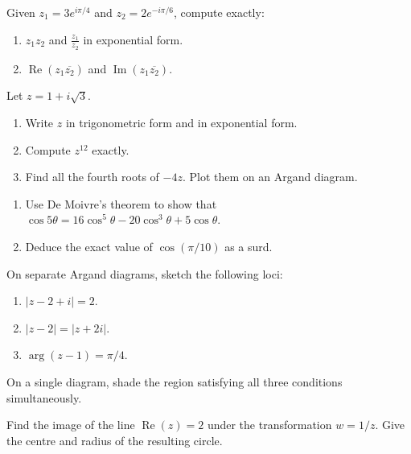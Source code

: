 \documentclass[11pt]{article}
\newcounter{popsec}
\newcounter{popsub}
\newcommand{\courssub}[1]{%
  \stepcounter{popsub}%
  \par\vspace{9pt}\noindent{\popxbold\fontsize{11.5}{13}\selectfont\color{popink}{\color{poporange}\thepopsec.\thepopsub}\hspace{6pt}#1}\par\nopagebreak\vspace{4pt}
}
\begin{document}
\begin{exercice}
Given $z_1 = 3e^{i\pi/4}$ and $z_2 = 2e^{-i\pi/6}$, compute exactly:
\begin{enumerate}
\item $z_1 z_2$ and $\frac{z_1}{z_2}$ in exponential form.
\item $\operatorname{Re}(z_1 \overline{z_2})$ and $\operatorname{Im}(z_1 \overline{z_2})$.
\end{enumerate}
\end{exercice}

\courssub{I practise}
\begin{exercice}
Let $z = 1 + i\sqrt{3}$.
\begin{enumerate}
\item Write $z$ in trigonometric form and in exponential form.
\item Compute $z^{12}$ exactly.
\item Find all the fourth roots of $-4z$. Plot them on an Argand diagram.
\end{enumerate}
\end{exercice}

\begin{exercice}
\begin{enumerate}
\item Use De Moivre's theorem to show that $\cos 5\theta = 16\cos^5\theta - 20\cos^3\theta + 5\cos\theta$.
\item Deduce the exact value of $\cos(\pi/10)$ as a surd.
\end{enumerate}
\end{exercice}

\begin{exercice}
On separate Argand diagrams, sketch the following loci:
\begin{enumerate}
\item $|z - 2 + i| = 2$.
\item $|z - 2| = |z + 2i|$.
\item $\arg(z - 1) = \pi/4$.
\end{enumerate}
On a single diagram, shade the region satisfying all three conditions simultaneously.
\end{exercice}

\begin{exercice}[Transformation $w = 1/z$]
Find the image of the line $\operatorname{Re}(z) = 2$ under the transformation $w = 1/z$. Give the centre and radius of the resulting circle.
\end{exercice}
\end{document}
